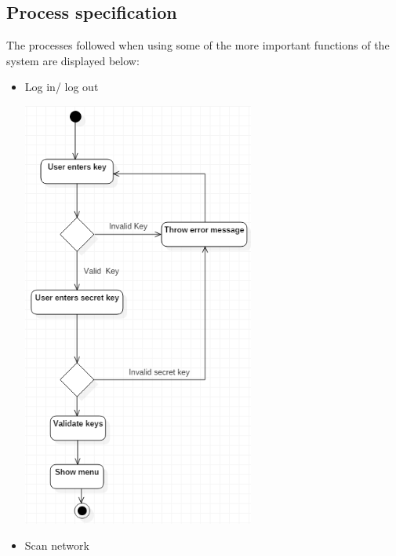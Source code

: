 \documentclass[a4paper,12pt]{report}
\begin{document}
\subsection{Process specification}
The processes followed when using some of the more important functions of the system are displayed below:
\begin{itemize}
	\item Log in/ log out
		\begin{center}
  	 	\includegraphics[width=0.6\textwidth] {./Diagrams/LoginSequence.png}\\[0.4cm]    
		\end{center}
	\newpage
	\item Scan network
		\begin{center}

\end{center}
\end{itemize}
\end{document}
